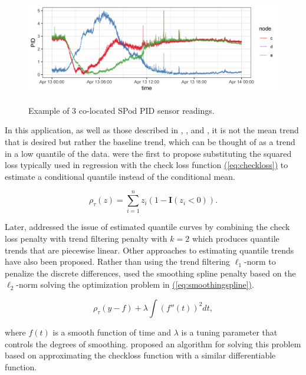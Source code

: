 \documentclass[12pt]{article}
\newcommand{\Eqn}[1]{\hyperref[eq:#1]{{\rm (\ref*{eq:#1})}}} %
\newcommand{\Eqn}[1]{{(\ref{eq:#1})}} %
\begin{document}
	\begin{figure}[b!]
		\caption{Example of 3 co-located SPod PID sensor readings.}
		\includegraphics[width = \linewidth]{Figures/uncorrected_data.png}
		\label{fig:raw_spod}
	\end{figure}
   	
	
	In this application, as well as those described in \cite{Ning2014}, \cite{marandi2015qualitative}, and \cite{pettersson2013algorithm}, it is not the mean trend that is desired but rather the baseline trend, which can be thought of as a trend in a low quantile of the data.  \cite{Koenker1978} were the first to propose substituting the squared loss typically used in regression with the check loss function  \Eqn{checkloss} to estimate a conditional quantile instead of the conditional mean. 
	
	\begin{equation}
	\label{eq:checkloss}
	 \rho_{\tau}(z) = \sum_{i=1}^n z_i(1-\mathbf{I}(z_i<0)).
	\end{equation}
	
	Later, \cite{KoenkerNgPortnoy1994} addressed the issue of estimated quantile curves by combining the check loss penalty with trend filtering penalty with $k = 2$ which produces quantile trends that are piecewise linear. Other approaches to estimating quantile trends have also been proposed. Rather than using the trend filtering $\ell_1$-norm to penalize the discrete differences, \cite{nychka1995nonparametric} used the smoothing spline penalty based on the $\ell_2$-norm solving the optimization problem in \Eqn{smoothingspline}. 
	
	\begin{equation*}
	\label{eq:smoothingspline}
	\rho_{\tau}(y - f) + \lambda\int (f''(t))^2 dt, 
 	\end{equation*}
	
	where $f(t)$ is a smooth function of time and $\lambda$ is a tuning parameter that controls the degrees of smoothing. \cite{Oh2011} proposed an algorithm for solving this problem based on approximating the checkloss function with a similar differentiable function. 
	
\end{document}
